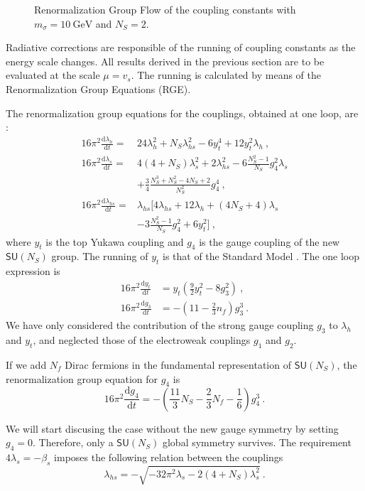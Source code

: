\documentclass[aps,prd,preprintnumbers,nofootinbibn,twocolumn]{revtex4}
\newcommand{\dif}{\mathrm{d}}
\begin{document}
\begin{figure}[t]
\begin{minipage}[b]{0.49\textwidth}
\caption{Renormalization Group Flow of the coupling constants with $m_\sigma = \SI{10}{\giga\electronvolt}$ and $N_S=2$.}\label{fig:sce2}
\end{minipage}
\end{figure}


Radiative corrections are responsible of the running of coupling constants as the energy scale changes. All results derived in the previous section are to be evaluated at the scale $\mu = v_s$. The running is calculated by means of the Renormalization Group Equations (RGE).

The renormalization group equations for the couplings, obtained at one loop, are \cite{Dermisek:2013pta}:
\begin{align}
16\pi^2 \frac{\dif \lambda_h}{\dif t} =& 24\lambda_h^2 + N_S \lambda_{hs}^2-6 y_t^4 +12y_t^2 \lambda_h \ ,\\
16\pi^2 \frac{\dif \lambda_s}{\dif t} =& 4(4+N_S)\lambda_s^2 + 2\lambda_{hs}^2 - 6 \frac{N_S^2-1}{N_S}g_4^2 \lambda_s \nonumber \\ &+ \frac{3}{4} \frac{N_S^3 + N_S^2-4N_S+2}{N_S^2}g_4^4 \ , \\
16\pi^2 \frac{\dif \lambda_{hs}}{\dif t} =& \lambda_{hs} \Big[ 4\lambda_{hs} +12\lambda_h +(4N_S+4)\lambda_s \nonumber \\ &-3 \frac{N_S^2-1}{N_S}g_4^2 +6y_t^2\Big]\ ,
\end{align}
where $y_t$ is the top Yukawa coupling and $g_4$ is the gauge coupling of the new $\mathsf{SU}(N_S)$ group. The running of $y_t$ is that of the Standard Model \cite{Eichhorn:2015kea}. The one loop expression is
\begin{align}
16\pi^2 \frac{\dif y_t}{\dif t} &= y_t\left(\frac{9}{2}y_t^2 -8g_3^2\right)\ ,\\
16\pi^2 \frac{\dif g_3}{\dif t} &= -\left(11-\frac{2}{3}n_f\right)g_3^3\ .
\end{align}
We have only considered the contribution of the strong gauge coupling $g_3$ to $\lambda_h$ and $y_t$, and neglected those of the electroweak couplings $g_1$ and $g_2$.

If we add $N_f$ Dirac fermions in the fundamental representation of $\mathsf{SU}(N_S)$, the renormalization group equation for $g_4$ is 
\begin{equation}
16\pi^2 \frac{\dif g_4}{\dif t} = -\left(\frac{11}{3}N_S-\frac{2}{3}N_f -\frac{1}{6}\right)g_4^3\ .
\end{equation}

We will start discusing the case without the new gauge symmetry by setting $g_4=0$. Therefore, only a $\mathsf{SU}(N_S)$ global symmetry survives. The requirement $4\lambda_s = -\beta_s$ imposes the following relation between the couplings
\begin{equation}\label{eq:lhs}
\lambda_{hs}=-\sqrt{-32\pi^2 \lambda_s -2(4+N_S)\lambda_s^2}\ .
\end{equation}
\end{document}
